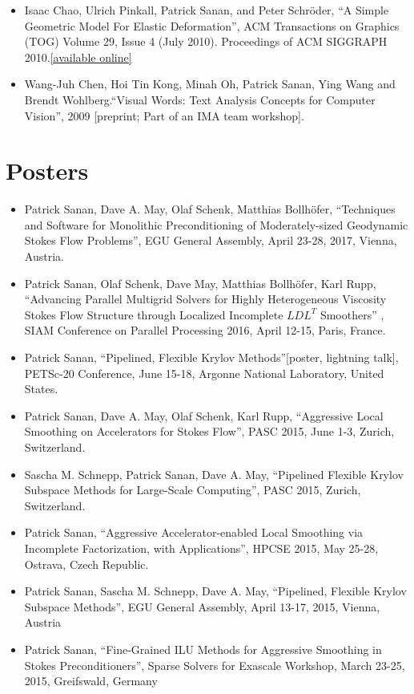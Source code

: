 \documentclass[12pt]{article}
\begin{document}
\begin{itemize}
\item Isaac Chao, Ulrich Pinkall, Patrick Sanan, and Peter Schr\"{o}der, ``A Simple Geometric Model For Elastic Deformation'', ACM Transactions on Graphics (TOG) Volume 29, Issue 4 (July 2010). Proceedings of ACM SIGGRAPH 2010.{\href{http://multires.caltech.edu/pubs/GeomElastic.pdf}{[available online]}}
\item Wang-Juh Chen, Hoi Tin Kong, Minah Oh, Patrick Sanan, Ying Wang and Brendt Wohlberg.``Visual Words: Text Analysis Concepts for Computer Vision'', 2009 [preprint; Part of an IMA team workshop].
\end{itemize}

\section*{Posters}
\begin{itemize}
\item Patrick Sanan, Dave A. May, Olaf Schenk, Matthias Bollh\"{o}fer, ``Techniques and Software for Monolithic Preconditioning of Moderately-sized Geodynamic Stokes Flow Problems'', EGU General Assembly, April 23-28, 2017, Vienna, Austria.
\item Patrick Sanan, Olaf Schenk, Dave May, Matthias Bollh\"{o}fer, Karl Rupp, ``Advancing Parallel Multigrid Solvers for Highly Heterogeneous Viscosity Stokes Flow Structure through Localized Incomplete $LDL^T$ Smoothers'' , SIAM Conference on Parallel Processing 2016, April 12-15, Paris, France.
\item Patrick Sanan, ``Pipelined, Flexible Krylov Methods''[poster, lightning talk], PETSc-20 Conference, June 15-18, Argonne National Laboratory, United States.
\item Patrick Sanan, Dave A. May, Olaf Schenk, Karl Rupp, ``Aggressive Local Smoothing on Accelerators for Stokes Flow'', PASC 2015, June 1-3, Zurich, Switzerland.
\item Sascha M. Schnepp, Patrick Sanan, Dave A. May, ``Pipelined Flexible Krylov Subspace Methods for Large-Scale Computing'', PASC 2015, Zurich, Switzerland.
\item Patrick Sanan, ``Aggressive Accelerator-enabled Local Smoothing via Incomplete Factorization, with Applications'', HPCSE 2015, May 25-28, Ostrava, Czech Republic.
\item Patrick Sanan, Sascha M. Schnepp, Dave A. May, ``Pipelined, Flexible Krylov Subspace Methods'', EGU General Assembly, April 13-17, 2015, Vienna, Austria
\item Patrick Sanan, ``Fine-Grained ILU Methods for Aggressive Smoothing in Stokes Preconditioners'', Sparse Solvers for Exascale Workshop, March 23-25, 2015, Greifswald, Germany

\end{itemize}
\end{document}
